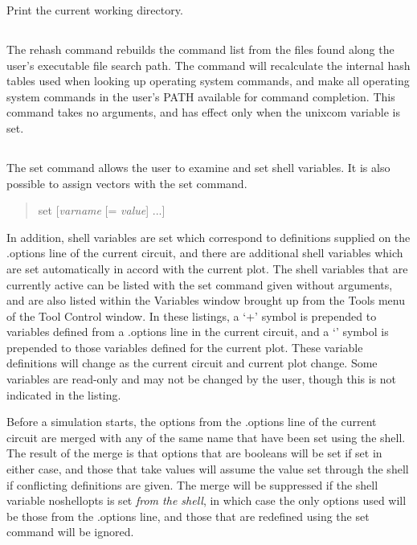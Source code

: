 
Print the current working directory.

\subsection{}


The {\cb rehash} command rebuilds the command list from the files
found along the user's executable file search path.  The command
will recalculate the internal hash tables used when looking up
operating system commands, and make all operating system commands in
the user's {\et PATH} available for command completion.  This
command takes no arguments, and has effect only when the {\et
unixcom} variable is set.

\subsection{}
\label{setcmd}


The {\cb set} command allows the user to examine and set shell
variables.  It is also possible to assign vectors with the {\cb set}
command.
\begin{quote}\vt
set [{\it varname} [= {\it value}] ...]
\end{quote}
In addition, shell variables are set which correspond to definitions
supplied on the {\vt .options} line of the current circuit, and there
are additional shell variables which are set automatically in accord
with the current plot.  The shell variables that are currently active
can be listed with the {\cb set} command given without arguments, and
are also listed within the {\cb Variables} window brought up from the
{\cb Tools} menu of the {\cb Tool Control} window.  In these listings,
a `{\vt +}' symbol is prepended to variables defined from a {\vt
.options} line in the current circuit, and a `{\vt *}' symbol is
prepended to those variables defined for the current plot.  These
variable definitions will change as the current circuit and current
plot change.  Some variables are read-only and may not be changed by
the user, though this is not indicated in the listing.

Before a simulation starts, the options from the {\vt .options} line
of the current circuit are merged with any of the same name that have
been set using the shell.  The result of the merge is that options
that are booleans will be set if set in either case, and those that
take values will assume the value set through the shell if conflicting
definitions are given.  The merge will be suppressed if the shell
variable {\et noshellopts} is set {\it from the shell}, in which case
the only options used will be those from the {\vt .options} line, and
those that are redefined using the {\cb set} command will be ignored.


